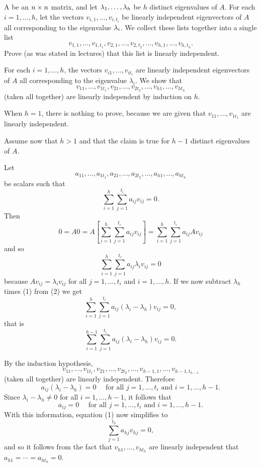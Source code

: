 \documentclass[a4paper]{amsart}
\renewenvironment{solution}{\SolutionInline}{\endSolutionInline}
\begin{document}
\begin{exercise}\label{ex-evectors-independent}
 A be an $n\times n$ matrix, and let $\lambda_1,\dotsc,\lambda_h$ be $h$ distinct
 eigenvalues of $A$.   For each $i=1,\dotsc,h$, let the vectors
 $v_{i,1},\dotsc,v_{i,t_i}$ be linearly independent eigenvectors of
 $A$ all corresponding to the eigenvalue $\lambda_i$.  We collect these
 lists together into a single list 
 \[ v_{1,1},\dotsc,v_{1,t_1},
    v_{2,1},\dotsc,v_{2,t_2},\dotsc,
    v_{h,1},\dotsc,v_{h,t_h}.
 \]
 Prove (as was stated in lectures) that this list is linearly independent.
\end{exercise}
\begin{solution}
 For each $i = 1, \ldots, h$, the vectors $v_{i1}, \ldots,
 v_{it_i}$ are linearly independent eigenvectors of $A$ all
 corresponding to the eigenvalue
 $\lambda_i$. We show that
 $$
 v_{11}, \ldots, v_{1t_1},v_{21}, \ldots, v_{2t_2}, \ldots, v_{h1},
 \ldots, v_{ht_h}
 $$
 (taken all together) are linearly independent by induction on $h$.

 When $h = 1$, there is nothing to prove, because we are given that
 $v_{11}, \ldots, v_{1t_1}$ are linearly independent.

 Assume now that $h>1$ and that the claim is true for $h-1$
 distinct eigenvalues of $A$.

 Let
 $$
 a_{11}, \ldots, a_{1t_1},a_{21}, \ldots, a_{2t_2}, \ldots, a_{h1},
 \ldots, a_{ht_h}
 $$
 be scalars such that
 \begin{equation}
 \sum_{i=1}^h \sum_{j=1}^{t_i} a_{ij}v_{ij} = 0.
 \end{equation}
 Then
 $$
 0 = A0 = A\left[\sum_{i=1}^h \sum_{j=1}^{t_i} a_{ij}v_{ij}\right]
 = \sum_{i=1}^h \sum_{j=1}^{t_i} a_{ij}Av_{ij}$$
 and so
 \begin{equation}
 \sum_{i=1}^h \sum_{j=1}^{t_i} a_{ij}\lambda_iv_{ij} = 0
 \end{equation}
 because $Av_{ij} = \lambda_iv_{ij}$ for all $j = 1, \ldots, t_i$ and
 $i = 1, \ldots, h$. If we
 now subtract $\lambda_h$ times (1) from (2) we get
 $$
 \sum_{i=1}^h \sum_{j=1}^{t_i} a_{ij}(\lambda_i - \lambda_h)v_{ij} = 0,
 $$
 that is
 $$
 \sum_{i=1}^{h-1} \sum_{j=1}^{t_i} a_{ij}(\lambda_i - \lambda_h)v_{ij} = 0.
 $$

 By the induction hypothesis, $$
 v_{11}, \ldots, v_{1t_1},v_{21}, \ldots, v_{2t_2}, \ldots,
 v_{h-1,1},
 \ldots, v_{h-1,t_{h-1}}
 $$
 (taken all together) are linearly independent. Therefore
 $$
 a_{ij}(\lambda_i - \lambda_h) = 0 \quad \text{~for all~} j = 1,
 \ldots, t_i
 \text{~and~} i = 1, \ldots, h-1.
 $$
 Since $\lambda_i - \lambda_h \neq 0$ for all $i = 1, \ldots, h-1$, it follows that
 $$
 a_{ij} = 0 \quad \text{~for all~} j = 1, \ldots, t_i
 \text{~and~} i = 1, \ldots, h-1.
 $$
 With this information, equation (1) now simplifies to
 $$
 \sum_{j=1}^{t_h} a_{hj}v_{hj} = 0,
 $$
 and so it follows from the fact that $v_{h1}, \ldots, v_{ht_h}$ are
 linearly independent that $a_{h1}= \cdots = a_{ht_h} = 0$.


\end{solution}
\end{document}
